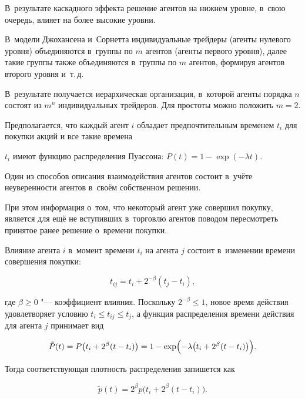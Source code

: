 В~результате каскадного эффекта решение агентов на нижнем уровне, в~свою очередь, влияет на более высокие уровни.



\smallskip


В~модели Джохансена и~Сорнетта индивидуальные трейдеры (агенты нулевого уровня) объединяются в~группы по $m$ агентов (агенты первого уровня), далее такие группы также объединяются в~группы по $m$ агентов, формируя агентов второго уровня и~т.\,д.

В~результате получается иерархическая организация, в~которой агенты порядка $n$ состоят из $m^{n}$ индивидуальных трейдеров. Для простоты можно положить $m=2$.



Предполагается, что каждый агент $i$ обладает предпочтительным временем $t_i $ для покупки акций и все такие времена

$t_i $ имеют функцию распределения Пуассона: $P (t)=1-\exp (-\lambda t)$.



Один из способов описания взаимодействия агентов состоит в~учёте неуверенности агентов в~своём собственном решении.

При этом информация о~том, что некоторый агент уже совершил покупку, является для ещё не вступивших в~торговлю агентов поводом пересмотреть принятое ранее решение о~времени покупки.



Влияние агента $i$ в~момент времени $t_i  $ на агента $j$ состоит в~изменении времени совершения покупки:

\[t_{i j} =t_i  +2^{-\beta } (t_j  - t_i  ), \]

где $\beta \ge 0$ "--- коэффициент влияния. Поскольку $2^{-\beta } \le 1$, новое время действия удовлетворяет условию $t_i  \le t_{i j} \le t_j  $,  а функция распределения времени действия для агента $j$ принимает вид

\[\tilde{P}(t)=P\bigl(t_i  +2^{\beta } (t  - t_i  )\bigr)=1-\exp \Bigl(-\lambda \bigl(t_i  +2^{\beta } (t-t_i)\bigr)\Bigr). \]

Тогда соответствующая плотность распределения запишется как

\begin{equation}

\tilde{p}(t)=2^{\beta } p\bigl(t_i  +2^{\beta } (t  - t_i  )\bigr).

\label{istereq:1}

\end{equation}

